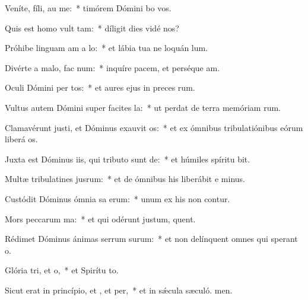 \item Veníte, fíli, au me:~* timórem Dómini bo vos.
\item Quis est homo  vult tam:~* díligit dies vidé nos?
\item Próhibe linguam am a lo:~* et lábia tua ne loquán lum.
\item Divérte a malo,  fac num:~* inquíre pacem, et perséque am.
\item Oculi Dómini per tos:~* et aures ejus in preces rum.
\item Vultus autem Dómini super facites la:~* ut perdat de terra memóriam rum.
\item Clamavérunt justi, et Dóminus exauvit os:~* et ex ómnibus tribulatiónibus eórum liberá os.
\item Juxta est Dóminus iis, qui tributo sunt de:~* et húmiles spíritu bit.
\item Multæ tribulatines jusrum:~* et de ómnibus his liberábit e minus.
\item Custódit Dóminus ómnia sa erum:~* unum ex his non contur.
\item Mors peccarum ma:~* et qui odérunt justum, quent.
\item Rédimet Dóminus ánimas serrum surum:~* et non delínquent omnes qui sperant  o.
\item Glória tri, et o,~* et Spirítu to.
\item Sicut erat in princípio, et , et per,~* et in sǽcula sæculó. men.
